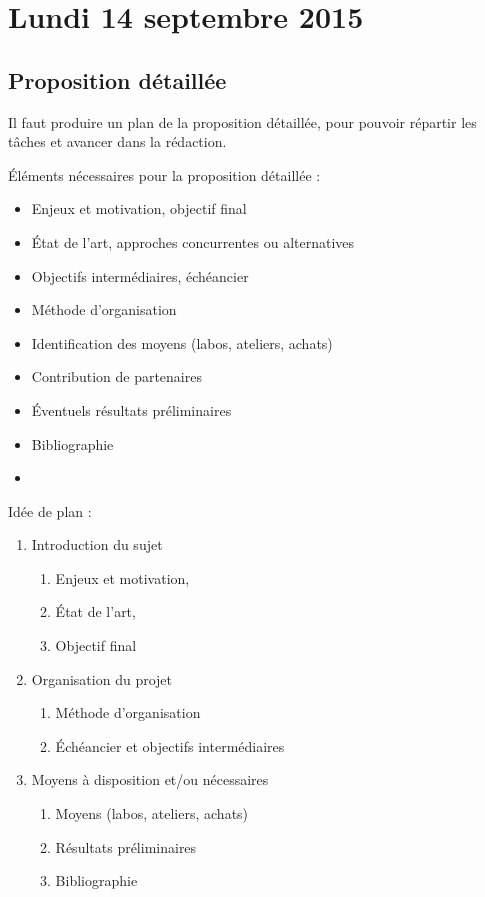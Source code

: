 \documentclass[a4paper, 11pt]{article}
\begin{document}
\section{Lundi 14 septembre 2015}

\subsection{Proposition détaillée}

Il faut produire un plan de la proposition détaillée, pour pouvoir répartir les tâches et avancer dans la rédaction.

Éléments nécessaires pour la proposition détaillée :
\begin{itemize}
	\item Enjeux et motivation, objectif final
	\item État de l'art, approches concurrentes ou alternatives
	\item Objectifs intermédiaires, échéancier
	\item Méthode d'organisation
	\item Identification des moyens (labos, ateliers, achats)
	\item Contribution de partenaires
	\item Éventuels résultats préliminaires
	\item Bibliographie
	\item 
\end{itemize}

Idée de plan :
\begin{enumerate}
	\item Introduction du sujet
		\begin{enumerate}
			\item Enjeux et motivation,
			\item État de l'art,
			\item Objectif final
		\end{enumerate}
	\item Organisation du projet
		\begin{enumerate}
			\item Méthode d'organisation
			\item Échéancier et objectifs intermédiaires
		\end{enumerate}
	\item Moyens à disposition et/ou nécessaires
		\begin{enumerate}
			\item Moyens (labos, ateliers, achats)
			\item Résultats préliminaires
			\item Bibliographie
		\end{enumerate}
\end{enumerate}
\end{document}
